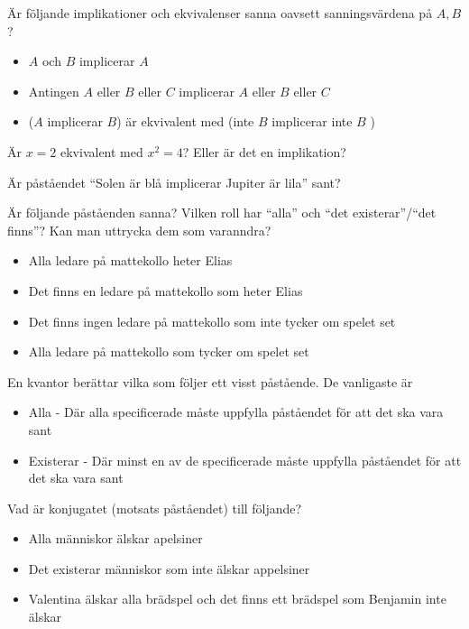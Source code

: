 \begin{problem}
	Är följande implikationer och ekvivalenser sanna oavsett sanningsvärdena på \(A, B\)?
	\begin{itemize}
		\item \(A\) och \(B\) implicerar \(A\) 
		\item Antingen \(A\) eller \(B\) eller \(C\) implicerar \(A\) eller \(B\) eller \(C\) 
		\item (\(A\) implicerar \(B\)) är ekvivalent med (inte \(B\) implicerar inte \(B\) )
	\end{itemize}
\end{problem}

\begin{problem}
	Är \(x=2\) ekvivalent med \(x^2=4\)? Eller är det en implikation? 
\end{problem}

\begin{problem}
	Är påståendet ``Solen är blå implicerar Jupiter är lila'' sant?
\end{problem}


\begin{problem}
	Är följande påståenden sanna? Vilken roll har ``alla'' och ``det existerar''/``det finns''? Kan man uttrycka dem som varanndra?
	\begin{itemize}
		\item Alla ledare på mattekollo heter Elias
		\item Det finns en ledare på mattekollo som heter Elias
		\item Det finns ingen ledare på mattekollo som inte tycker om spelet set
		\item Alla ledare på mattekollo som tycker om spelet set
	\end{itemize}
\end{problem}

\begin{definition}[Kvantor]
	En kvantor berättar vilka som följer ett visst påstående. De vanligaste är
	\begin{itemize}
		\item Alla - Där alla specificerade måste uppfylla påståendet för att det ska vara sant
		\item Existerar - Där minst en av de specificerade måste uppfylla påståendet för att det ska vara sant
	\end{itemize}
\end{definition}

\begin{problem}
	Vad är konjugatet (motsats påståendet) till följande?
	\begin{itemize}
		\item Alla människor älskar apelsiner
		\item Det existerar människor som inte älskar appelsiner
		\item Valentina älskar alla brädspel och det finns ett brädspel som Benjamin inte älskar
	\end{itemize}
\end{problem}


